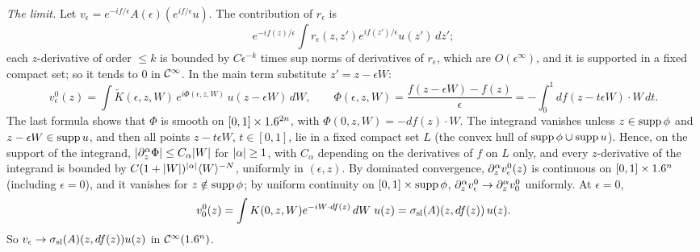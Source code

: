 \emph{The limit.} Let $v_\epsilon=e^{-if/\epsilon}A(\epsilon)(e^{if/\epsilon}u)$. The
contribution of $r_\epsilon$ is
\begin{equation*}
  e^{-if(z)/\epsilon}\int r_\epsilon(z,z')e^{if(z')/\epsilon}u(z')\,dz';
\end{equation*}
each $z$-derivative of order $\le k$ is bounded by
$C\epsilon^{-k}$ times sup norms of derivatives of $r_\epsilon$, which are
$O(\epsilon^\infty)$, and it is supported in a fixed compact set; so it tends to $0$
in $\mathcal{C}^\infty$. In the main term substitute $z'=z-\epsilon W$:
\begin{equation*}
  v^0_\epsilon(z)=\int\tilde K(\epsilon,z,W)\,e^{i\Phi(\epsilon,z,W)}\,
  u(z-\epsilon W)\,dW,\qquad
  \Phi(\epsilon,z,W)=\frac{f(z-\epsilon W)-f(z)}\epsilon
  =-\int_0^1df(z-t\epsilon W)\cdot W\,dt .
\end{equation*}
The last formula shows that $\Phi$ is smooth on $[0,1]\times1.6^{2n}$, with
$\Phi(0,z,W)=-df(z)\cdot W$. The integrand vanishes unless $z\in\operatorname{supp}\phi$ and
$z-\epsilon W\in\operatorname{supp} u$, and then all points $z-t\epsilon W$, $t\in[0,1]$, lie in a
fixed compact set $L$ (the convex hull of $\operatorname{supp}\phi\cup\operatorname{supp} u$). Hence, on the
support of the integrand, $\lvert \partial_z^\alpha\Phi\rvert\le C_\alpha\lvert W\rvert$ for
$\lvert \alpha\rvert\ge1$, with $C_\alpha$ depending on the derivatives of $f$ on $L$ only,
and every $z$-derivative of the integrand is bounded by
$C(1+\lvert W\rvert)^{\lvert \alpha\rvert}\langle W\rangle^{-N}$, uniformly in $(\epsilon,z)$. By dominated
convergence, $\partial_z^\alpha v_\epsilon^0(z)$ is continuous on $[0,1]\times1.6^n$
(including $\epsilon=0$), and it vanishes for $z\notin\operatorname{supp}\phi$; by uniform
continuity on $[0,1]\times\operatorname{supp}\phi$, $\partial^\alpha_zv^0_\epsilon\to\partial^\alpha_zv^0_0$
uniformly. At $\epsilon=0$,
\begin{equation*}
  v^0_0(z)=\int K(0,z,W)e^{-iW\cdot df(z)}\,dW\;u(z)=\sigma_{\mathrm{sl}}(A)(z,df(z))\,u(z).
\end{equation*}
So $v_\epsilon\to\sigma_{\mathrm{sl}}(A)(z,df(z))u(z)$ in $\mathcal{C}^\infty(1.6^n)$.

